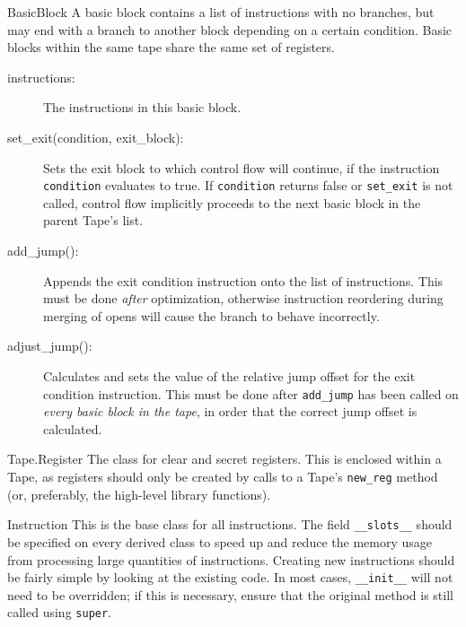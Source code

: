 \begin{mylisting}
\begin{class}{BasicBlock}
A basic block contains a list of instructions with no branches, but may
end with a branch to another block depending on a certain condition. Basic
blocks within the same tape share the same set of registers.
\begin{description}
\item[instructions:] The instructions in this basic block. 
\item[set_exit(condition, exit_block):] Sets the exit block to which control
flow will continue, if the instruction \verb|condition| evaluates to true.
If \verb|condition| returns false
or \verb|set_exit| is not called, control flow implicitly
proceeds to the next basic block in the parent Tape's list.
\item[add_jump():] Appends the exit condition instruction onto the list of
instructions. This must be done \emph{after} optimization, otherwise instruction
reordering during merging of opens will cause the branch to behave incorrectly.
\item[adjust_jump():] Calculates and sets the value of the relative jump
offset for the exit
condition instruction. This must be done after \verb|add_jump| has been called
on \emph{every basic block in the tape}, in order that the correct jump offset
is calculated.
\end{description}
\end{class}

\begin{class}{Tape.Register}
The class for clear and secret registers. This is enclosed within a Tape, as
registers should only be created by calls to a Tape's \verb|new_reg| method
(or, preferably, the high-level library functions).
\end{class}

\begin{class}{Instruction}
This is the base class for all instructions. The field \verb|__slots__| should
be specified on every derived class to speed up and reduce the memory usage from
processing large quantities of instructions. Creating new instructions should
be fairly simple by looking at the existing code. In most cases,
\verb|__init__| will not need to be overridden; if this is necessary, ensure
that the original method is still called using \verb|super|.


\end{class}
\end{mylisting}
